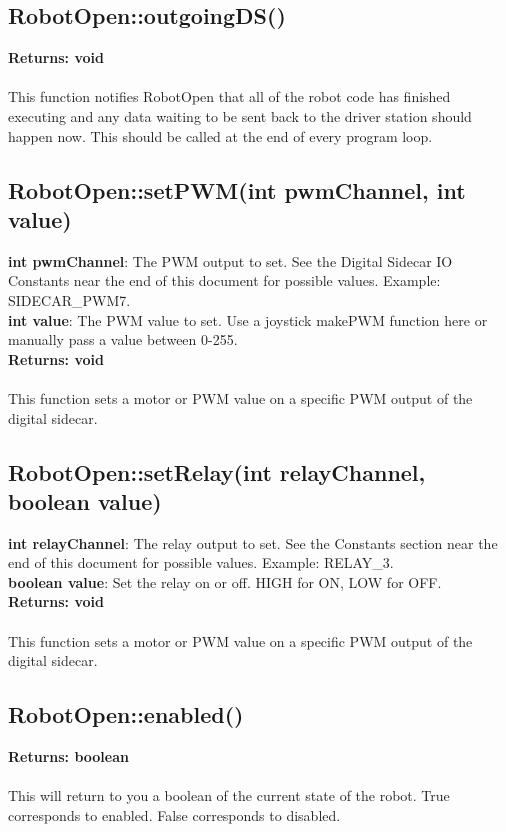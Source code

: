 \documentclass[11pt]{article} %
\begin{document}
\subsection{RobotOpen::outgoingDS()}
\textbf{Returns: void}\\\\
This function notifies RobotOpen that all of the robot code has finished executing and any data waiting to be sent back to the driver station should happen now. This should be called at the end of every program loop.
\subsection{RobotOpen::setPWM(int pwmChannel, int value)}
\textbf{int pwmChannel}: The PWM output to set. See the Digital Sidecar IO Constants near the end of this document for possible values. Example: SIDECAR\_PWM7.\\
\textbf{int value}: The PWM value to set. Use a joystick makePWM function here or manually pass a value between 0-255.\\
\textbf{Returns: void}\\\\
This function sets a motor or PWM value on a specific PWM output of the digital sidecar.
\subsection{RobotOpen::setRelay(int relayChannel, boolean value)}
\textbf{int relayChannel}: The relay output to set. See the Constants section near the end of this document for possible values. Example: RELAY\_3.\\
\textbf{boolean value}: Set the relay on or off. HIGH for ON, LOW for OFF.\\
\textbf{Returns: void}\\\\
This function sets a motor or PWM value on a specific PWM output of the digital sidecar.
\subsection{RobotOpen::enabled()}
\textbf{Returns: boolean}\\\\
This will return to you a boolean of the current state of the robot. True corresponds to enabled. False corresponds to disabled.
\end{document}
